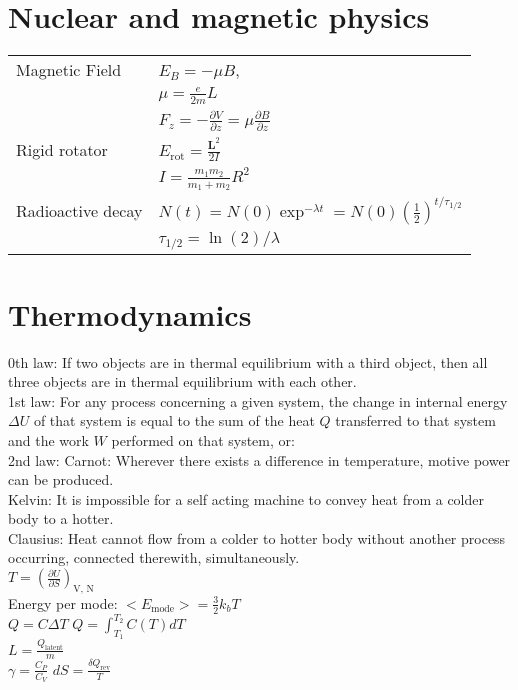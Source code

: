 \documentclass[12pt,a4paper]{article}
\begin{document}
	
	\section*{Nuclear and magnetic physics}
	\begin{tabular}{ll}
		{Magnetic Field} & \(E_B = - \mu B \), \\
		& \( \mu = \frac{e}{2m} L\)\\
		& \( F_z = - \frac{\partial V}{\partial z} = \mu \frac{\partial B}{\partial z}  \)\\
		{Rigid rotator} & \(E_\text{rot} = \frac{\textbf{L}^2}{2I}\) \\
		& \( I = \frac{m_1 m_2 }{m_1 + m_2} R^2 \) \\
		{Radioactive decay} & \( N(t) = N(0) \exp ^ {-\lambda t} = N(0) (\frac{1}{2})^{t/\tau _{1/2}}\)\\
		& \( \tau _{1/2} = \ln (2) / \lambda\)\\
	\end{tabular}
	
	\section*{Thermodynamics}
	0th law: If two objects are in thermal equilibrium with a third object, then all three objects are in thermal equilibrium with each other.\\
	1st law: For any process concerning a given system, the change in internal energy $\Delta U$ of that system is equal to the sum of the heat $Q$ transferred to that system and the work $W$ performed on that system, or:\\
	2nd law: Carnot: Wherever there exists a difference in temperature, motive power can be produced.\\
	Kelvin: It is impossible for a self acting machine to convey heat from a colder body to a hotter.\\
	Clausius: Heat cannot flow from a colder to hotter body without another process occurring, connected therewith, simultaneously.\\
	$T = (\frac{\partial U}{\partial S})_\text{V, N}$\\
	
	Energy per mode: $<E_\text{mode}> = \frac{3}{2} k_b T$\\
	$Q = C \Delta T$ $Q=\int_{T_1}^{T_2}C(T) dT$\\
	 $L =\frac{Q_\text{latent}}{m}$\\
	 $\gamma = \frac{C_P}{C_V}$
	 $d S = \frac{\delta Q_\text{rev}}{T}$\\	
	
\end{document}
